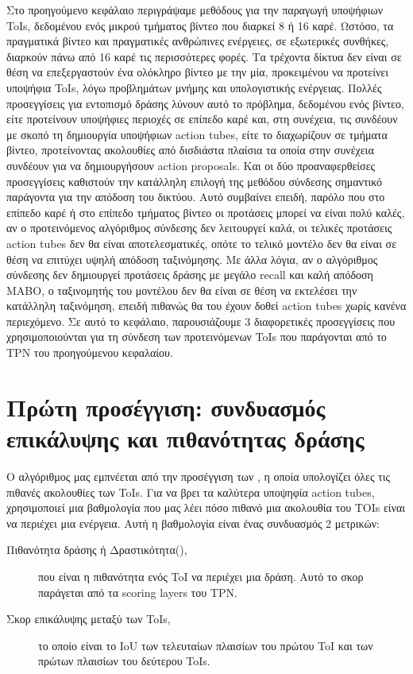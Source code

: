 Στο προηγούμενο κεφάλαιο περιγράψαμε μεθόδους για την παραγωγή υποψήφιων \en ToIs\gr, δεδομένου ενός μικρού τμήματος βίντεο που διαρκεί 8 ή 16 καρέ. Ωστόσο, τα πραγματικά βίντεο και πραγματικές ανθρώπινες ενέργειες, σε εξωτερικές συνθήκες, διαρκούν πάνω από 16 καρέ τις περισσότερες φορές. Τα τρέχοντα δίκτυα δεν είναι σε θέση να επεξεργαστούν ένα ολόκληρο βίντεο με την μία, προκειμένου να προτείνει υποψήφια \en ToIs\gr,
λόγω προβλημάτων μνήμης και υπολογιστικής ενέργειας.
Πολλές προσεγγίσεις για εντοπισμό δράσης λύνουν αυτό το πρόβλημα, δεδομένου ενός βίντεο, είτε
προτείνουν υποψήφιες περιοχές σε επίπεδο καρέ και, στη συνέχεια, τις συνδέουν με σκοπό τη δημιουργία υποψήφιων \en action tubes\gr, είτε
το διαχωρίζουν σε τμήματα βίντεο, προτείνοντας ακολουθίες από δισδιάστα πλαίσια τα οποία στην συνέχεια συνδέουν για να δημιουργήσουν
\en action proposals\gr.
Και οι δύο προαναφερθείσες προσεγγίσεις καθιστούν την κατάλληλη επιλογή της μεθόδου σύνδεσης σημαντικό παράγοντα για την απόδοση του δικτύου.
Αυτό συμβαίνει επειδή, παρόλο που στο επίπεδο καρέ ή στο επίπεδο τμήματος βίντεο
οι προτάσεις μπορεί να είναι πολύ καλές, αν ο προτεινόμενος αλγόριθμος σύνδεσης δεν λειτουργεί καλά, οι τελικές προτάσεις \en action tubes \gr
δεν θα είναι αποτελεσματικές, οπότε το τελικό μοντέλο δεν θα
είναι σε θέση να επιτύχει υψηλή απόδοση ταξινόμησης.
Με άλλα λόγια, αν ο αλγόριθμος σύνδεσης δεν δημιουργεί προτάσεις δράσης με μεγάλο \en recall \gr και καλή απόδοση \en MABO\gr,
ο ταξινομητής του μοντέλου δεν θα είναι σε θέση να εκτελέσει την κατάλληλη ταξινόμηση, επειδή πιθανώς θα του έχουν δοθεί \en action tubes \gr χωρίς κανένα περιεχόμενο.
Σε αυτό το κεφάλαιο, παρουσιάζουμε 3 διαφορετικές προσεγγίσεις που χρησιμοποιούνται για τη σύνδεση των προτεινόμενων ToIs που παράγονται από το \en TPN \gr του προηγούμενου κεφαλαίου.

\section{Πρώτη προσέγγιση: συνδυασμός επικάλυψης και πιθανότητας δράσης}
Ο αλγόριθμος μας εμπνέεται από την προσέγγιση των \en\cite{DBLP:journals/corr/HouCS17}\gr, η οποία υπολογίζει όλες τις πιθανές ακολουθίες των \en ToIs\gr. Για να βρει τα  καλύτερα υποψηφία \en action tubes\gr,
χρησιμοποιεί μια βαθμολογία που μας λέει πόσο πιθανό μια ακολουθία του TOIs είναι να περιέχει μια ενέργεια. Αυτή η βαθμολογία είναι ένας συνδυασμός 2 μετρικών:
\begin{description}
\item[ Πιθανότητα δράσης ή Δραστικότητα(), ] που είναι η πιθανότητα ενός \en ToI \gr να περιέχει μια δράση. Αυτό το σκορ
  παράγεται από τα \en scoring layers \gr  του \en TPN\gr.
\item [Σκορ επικάλυψης μεταξύ των \en ToIs\gr, ] το οποίο είναι το \en IoU \gr των τελευταίων πλαισίων του πρώτου \en ToI \gr και των πρώτων πλαισίων του δεύτερου \en ToIs\gr.
\end{description}

